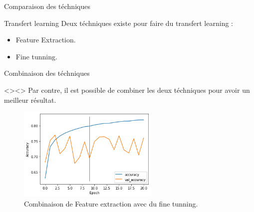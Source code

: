 \documentclass[10pt,handout]{beamer}
\begin{document}
\begin{frame}{Comparaison des téchniques}
    \begin{block}{Transfert learning}
        Deux téchniques existe pour faire du transfert learning : 
        \begin{itemize}
            \item Feature Extraction.
            \item Fine tunning. 
        \end{itemize}
    \end{block}

    \begin{figure}
        \qquad
    \end{figure}

\end{frame}


\begin{frame}{Combinaison des téchniques}
    \begin{block}<>{}<>
        Par contre, il est possible de combiner les deux téchniques pour avoir un meilleur résultat.
    \end{block}

    \begin{figure}
        \centering
        \includegraphics[width=0.6\textwidth]{img/combined_ft_extract_fine_tun/acc.png}
        \caption{Combinaison de Feature extraction avec du fine tunning.}
    \end{figure}

\end{frame}
\end{document}
